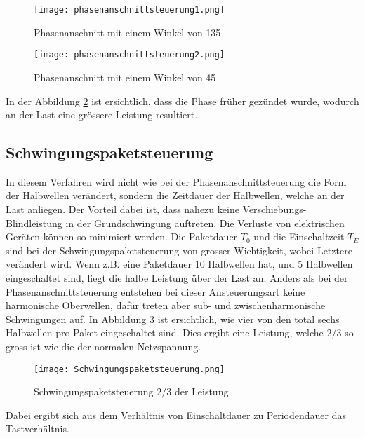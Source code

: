 \begin{figure}[ht!]
	\centering
	\texttt{[image: phasenanschnittsteuerung1.png]}	
	\caption{Phasenanschnitt mit einem Winkel von 135\textdegree \cite{Phasenanschnittsteuerung}}\label{fig:Phasenanschnitt1}
\end{figure}
\newpage
\begin{figure}[ht!]
	\centering
	\texttt{[image: phasenanschnittsteuerung2.png]}	
	\caption{Phasenanschnitt mit einem Winkel von 45\textdegree \cite{Phasenanschnittsteuerung}}\label{fig:Phasenanschnitt2}
\end{figure}

In der Abbildung \ref{fig:Phasenanschnitt2} ist ersichtlich, dass die Phase früher gezündet wurde, wodurch an der Last eine grössere Leistung resultiert.



\subsection{Schwingungspaketsteuerung}\label{sec:Schwingungspaketsteuerung}
In diesem Verfahren wird nicht wie bei der Phasenanschnittsteuerung die Form der Halbwellen verändert, sondern die Zeitdauer der Halbwellen, welche an der Last anliegen. Der Vorteil dabei ist, dass nahezu keine Verschiebungs-Blindleistung in der Grundschwingung auftreten. Die Verluste von elektrischen Geräten können so minimiert werden. Die Paketdauer $T_0$ und die Einschaltzeit $T_E$ sind bei der Schwingungspaketsteuerung von grosser Wichtigkeit, wobei Letztere verändert wird. Wenn z.B. eine Paketdauer 10 Halbwellen hat, und 5 Halbwellen eingeschaltet sind, liegt die halbe Leistung über der Last an. Anders als bei der Phasenanschnittsteuerung entstehen bei dieser Ansteuerungsart keine harmonische Oberwellen, dafür treten aber sub- und zwischenharmonische Schwingungen auf. In Abbildung \ref{fig:Schwingungspaketsteuerung} ist ersichtlich, wie vier von den total sechs Halbwellen pro Paket eingeschaltet sind. Dies ergibt eine Leistung, welche ${2}/{3}$ so gross ist wie die der normalen Netzspannung.

\begin{figure}[ht!]
	\centering
	\texttt{[image: Schwingungspaketsteuerung.png]}	
	\caption{Schwingungspaketsteuerung ${2}/{3}$ der Leistung \cite{Schwingungspaketsteuerung}}\label{fig:Schwingungspaketsteuerung}
\end{figure}

Dabei ergibt sich aus dem Verhältnis von Einschaltdauer zu Periodendauer das Tastverhältnis.

